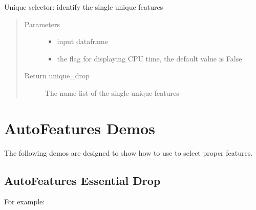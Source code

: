 \documentclass[letterpaper,11pt,english]{sphinxmanual}
\begin{document}
\begin{fulllineitems}
\begin{fulllineitems}
\end{fulllineitems}


\begin{fulllineitems}
\label{\detokenize{auto_feature:AutoFeatures.AutoFeatures.unique_selector}}
Unique selector: identify the single unique features
\begin{quote}\begin{description}
\item[{Parameters}] \leavevmode\begin{itemize}
\item {} 
 \textendash{} input dataframe

\item {} 
 \textendash{} the flag for displaying CPU time, the default value is False

\end{itemize}

\item[{Return unique\_drop}] \leavevmode
The name list of the single unique features

\end{description}\end{quote}

\end{fulllineitems}


\end{fulllineitems}



\chapter{AutoFeatures Demos}
\label{\detokenize{demo:autofeatures-demos}}\label{\detokenize{demo:demo}}\label{\detokenize{demo::doc}}
The following demos are designed to show how to use  to select proper features.


\section{AutoFeatures Essential Drop}
\label{\detokenize{demo:autofeatures-essential-drop}}
For example:
\end{document}
